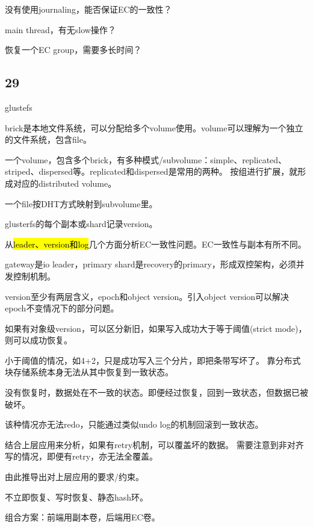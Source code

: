 \begin{enumbox}
\item 没有使用journaling，能否保证EC的一致性？
\item main thread，有无slow操作？
\item 恢复一个EC group，需要多长时间？
\end{enumbox}

\subsection{29}

glustefs

brick是本地文件系统，可以分配给多个volume使用。volume可以理解为一个独立的文件系统，包含file。

一个volume，包含多个brick，有多种模式/subvolume：simple、replicated、striped、dispersed等。replicated和dispersed是常用的两种。
按组进行扩展，就形成对应的distributed volume。

一个file按DHT方式映射到subvolume里。

glusterfs的每个副本或shard记录version。

\hrulefill

从\hl{leader、version和log}几个方面分析EC一致性问题。EC一致性与副本有所不同。

gateway是io leader，primary shard是recovery的primary，形成双控架构，必须并发控制机制。

version至少有两层含义，epoch和object version。引入object version可以解决epoch不变情况下的部分问题。

如果有对象级version，可以区分新旧，如果写入成功大于等于阈值(strict mode)，则可以成功恢复。

小于阈值的情况，如4+2，只是成功写入三个分片，即把条带写坏了。
靠分布式块存储系统本身无法从其中恢复到一致状态。

没有恢复时，数据处在不一致的状态。即便经过恢复，回到一致状态，但数据已被破坏。

该种情况亦无法redo，只能通过类似undo log的机制回滚到一致状态。

结合上层应用来分析，如果有retry机制，可以覆盖坏的数据。
需要注意到非对齐写的情况，即便有retry，亦无法全覆盖。

由此推导出对上层应用的要求/约束。

\hrulefill

不立即恢复、写时恢复、静态hash环。

组合方案：前端用副本卷，后端用EC卷。
